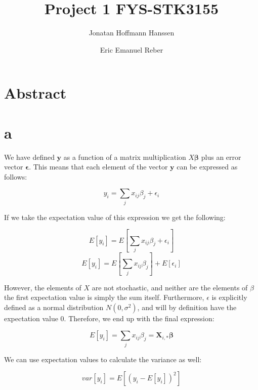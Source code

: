 \documentclass{article}
\author{Jonatan Hoffmann Hanssen \and Eric Emanuel Reber}
\title{Project 1 FYS-STK3155}
\begin{document}
	\maketitle

\section*{Abstract}

\section*{a}

We have defined $\bm{y}$ as a function of a matrix multiplication $X\bm{\beta}$
plus an error vector $\bm{\epsilon}$. This means that each element of the vector
$\bm{y}$ can be expressed as follows:

\[ y_i = \sum_j x_{ij}\beta_j + \epsilon_i \]

If we take the expectation value of this expression we get the following:

\[ E[y_i] = E\left[\sum_j x_{ij}\beta_j + \epsilon_i\right] \]
\[ E[y_i] = E\left[\sum_j x_{ij}\beta_j\right] + E[\epsilon_i] \]

However, the elements of $X$ are not stochastic, and neither are the elements of $\beta$
the first expectation value is simply the sum itself. Furthermore, $\epsilon$ is 
explicitly defined as a normal distribution $N(0,\sigma^2)$, and will by definition have
the expectation value $0$. Therefore, we end up with the final expression:

\[ E[y_i] = \sum_j x_{ij}\beta_j = \bm{X}_{i,*}\bm{\beta}\]

We can use expectation values to calculate the variance as well:

\[ var[y_i] = E\left[(y_i - E[y_i])^2\right] \]
\end{document}
